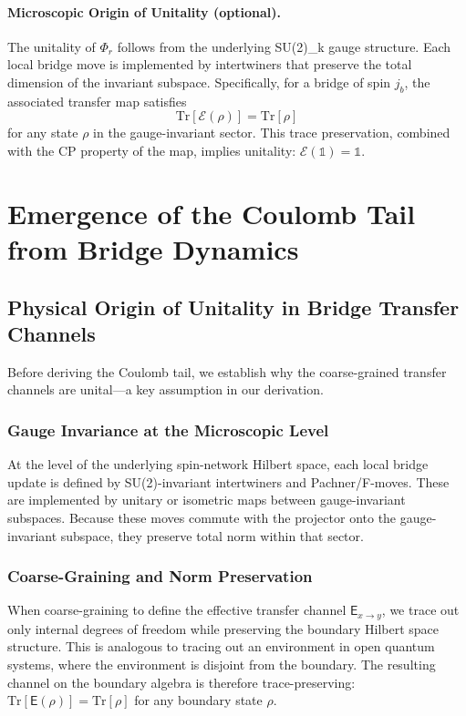 \documentclass[11pt]{article}
\theoremstyle{plain}
\theoremstyle{definition}
\begin{document}
\paragraph{Microscopic Origin of Unitality (optional).}
The unitality of $\Phi_r$ follows from the underlying SU(2)_k gauge structure. Each local bridge move is implemented by intertwiners that preserve the total dimension of the invariant subspace. Specifically, for a bridge of spin $j_b$, the associated transfer map satisfies
\[
  \mathrm{Tr}[\mathcal{E}(\rho)] = \mathrm{Tr}[\rho]
\]
for any state $\rho$ in the gauge-invariant sector. This trace preservation, combined with the CP property of the map, implies unitality: $\mathcal{E}(\mathbb{1}) = \mathbb{1}$.

\section{Emergence of the Coulomb Tail from Bridge Dynamics}\label{sec:coulomb-derivation}

\subsection{Physical Origin of Unitality in Bridge Transfer Channels}
\label{subsec:unitality-physical}

Before deriving the Coulomb tail, we establish why the coarse-grained transfer channels are unital—a key assumption in our derivation.

\subsubsection{Gauge Invariance at the Microscopic Level}
At the level of the underlying spin-network Hilbert space, each local bridge update is defined by SU(2)-invariant intertwiners and Pachner/F-moves. These are implemented by unitary or isometric maps between gauge-invariant subspaces. Because these moves commute with the projector onto the gauge-invariant subspace, they preserve total norm within that sector.

\subsubsection{Coarse-Graining and Norm Preservation}
When coarse-graining to define the effective transfer channel $\mathsf{E}_{x\to y}$, we trace out only internal degrees of freedom while preserving the boundary Hilbert space structure. This is analogous to tracing out an environment in open quantum systems, where the environment is disjoint from the boundary. The resulting channel on the boundary algebra is therefore trace-preserving: $\mathrm{Tr}[\mathsf{E}(\rho)] = \mathrm{Tr}[\rho]$ for any boundary state $\rho$.
\end{document}
